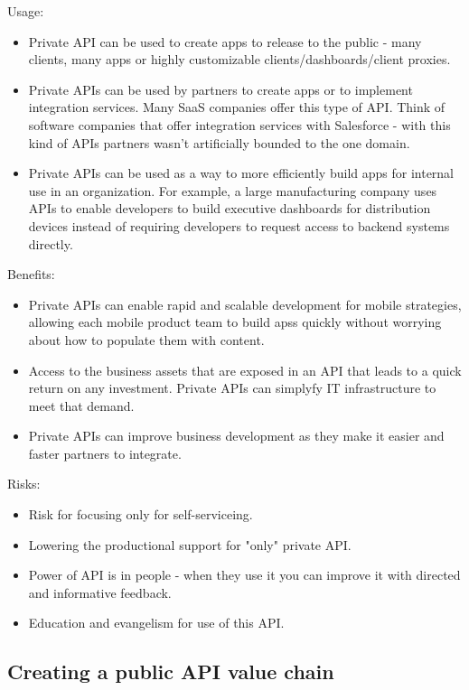 \documentclass[11pt,a4paper]{article}
\begin{document}
Usage:
\begin{itemize}
	\item Private API can be used to create apps to release to the public - many clients, many apps or highly customizable clients/dashboards/client proxies.
	\item Private APIs can be used by partners to create apps or to implement integration services. Many SaaS companies offer this type of API. Think of software companies that offer integration services with Salesforce - with this kind of APIs partners wasn't artificially bounded to the one domain.
	\item Private APIs can be used as a way to more efficiently build apps for internal use in an organization. For example, a large manufacturing company uses APIs to enable developers to build executive dashboards for distribution devices instead of requiring developers to request access to backend systems directly.
\end{itemize}

Benefits:
\begin{itemize}
	\item Private APIs can enable rapid and scalable development for mobile strategies, allowing each mobile product team to build apss quickly without worrying about how to populate them with content.
	\item Access to the business assets that are exposed in an API that leads to a quick return on any investment. Private APIs can simplyfy IT infrastructure to meet that demand.
	\item Private APIs can improve business development as they make it easier and faster partners to integrate.
\end{itemize}

Risks:
\begin{itemize}
	\item Risk for focusing only for self-serviceing.
	\item Lowering the productional support for "only" private API.
	\item Power of API is in people - when they use it you can improve it with directed and informative feedback.
	\item Education and evangelism for use of this API.
\end{itemize}

\subsection{Creating a public API value chain}
\end{document}
